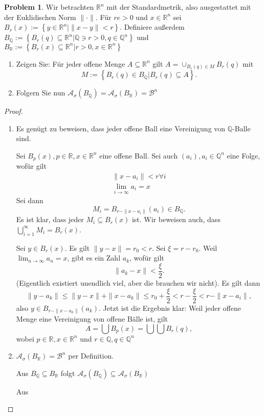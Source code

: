 \documentclass[prb,12pt]{revtex4-2}
\theoremstyle{definition}
\newtheorem{Problem}{Problem}
\theoremstyle{definition}
\newenvironment{parts}{\begin{enumerate}[label=(\alph*)]}{\end{enumerate}}
\newcommand{\R}{\mathbb{R}}
\newcommand{\Q}{\mathbb{Q}}
\begin{document}
\begin{Problem}
	Wir betrachten $\R^n$ mit der Standardmetrik, also ausgestattet mit der Euklidischen Norm $\|\cdot\|$. F\"{u}r $re>0$ und $x\in \R^n$ sei $B_r(x):=\left\{ y\in \R^n |\|x-y\|<r \right\} $. Definiere außerdem $B_\Q := \left\{ B_r(q)\subseteq \R^n | \Q \ni r > 0, q \in \Q^n \right\} $ und $B_\R :=\left\{ B_r(x)\subseteq \R^n | r > 0, x \in \R^n \right\} $ 
	\begin{parts}
	\item Zeigen Sie: F\"{u}r jeder offene Menge $A\subseteq \R^n$ gilt $A=\cup_{B_r(q)\in M}B_r(q)$ mit
		\[
		M:= \left\{ B_r(q)\in B_\Q| B_r(q)\subseteq A \right\} 
		.\]
	\item Folgern Sie nun $\mathcal A_\sigma (B_\Q)=\mathcal A_\sigma(B_\R)=\mathcal{B}^n$
	\end{parts}
\end{Problem}

\begin{proof}
\begin{parts}
\item Es genügt zu beweisen, dass jeder offene Ball eine Vereinigung von $\Q$-Balle sind.

	Sei $B_p(x), p\in \R, x\in \R^n$ eine offene Ball. Sei auch $(a_i), a_i\in \Q^n$ eine Folge, wof\"{u}r gilt
\begin{gather*}
	\|x-a_i\|<r \forall i\\
	\lim_{i \to \infty} a_i=x
\end{gather*}
Sei dann
\[
	M_i=B_{r-\|x-a_i\|}(a_i)\in B_\Q
.\] 
Es ist klar, dass jeder $M_i\subseteq B_r(x)$ ist. Wir beweisen auch, dass $\bigcup_{i=1} ^\infty M_i=B_r(x)$.

Sei $y\in B_r(x)$. Es gilt $\|y-x\|=r_0<r$. Sei $\xi=r-r_0$. Weil $\lim_{n \to \infty} a_n=x$, gibt es ein Zahl $a_k$, wof\"{u}r gilt
\[
\|a_k-x\|<\frac{\xi}{2}
.\] 
(Eigentlich existiert unendlich viel, aber die brauchen wir nicht). Es gilt dann
\[
\|y-a_k\|\le \|y-x\|+\|x-a_k\|\le r_0+\frac{\xi}{2}<r-\frac{\xi}{2}<r-\|x-a_i\|
,\] 
also $y\in B_{r-\|x-a_k\|}(a_k)$. Jetzt ist die Ergebnis klar: Weil jeder offene Menge eine Vereinigung von offene B\"{a}lle ist, gilt
\[
A=\bigcup B_p(x)= \bigcup \bigcup B_r(q)
,\] 
wobei $ p\in \R, x\in \R^n$ und $r\in \Q, q\in \Q^n$

\item $\mathcal A_\sigma\left( B_\R \right) =\mathcal B^n$ per Definition. 

	Aus $B_\Q\subseteq B_\R$ folgt $\mathcal A_\sigma\left( B_\Q \right)  \subseteq \mathcal A_\sigma\left( B_\R \right) $

Aus 
\end{parts}
\end{proof}
\end{document}
